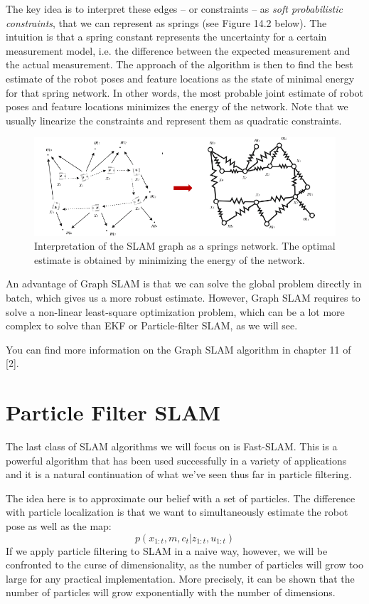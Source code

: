 \documentclass[twoside]{article}
\begin{document}
The key idea is to interpret these edges -- or constraints -- as \textit{soft probabilistic constraints}, that we can represent as springs (see Figure 14.2 below). The intuition is that a spring constant represents the uncertainty for a certain measurement model, i.e. the difference between the expected measurement and the actual measurement. The approach of the algorithm is then to find the best estimate of the robot poses and feature locations as the state of minimal energy for that spring network. In other words, the most probable joint estimate of robot poses and feature locations minimizes the energy of the network. Note that we usually linearize the constraints and represent them as quadratic constraints.

\begin{figure}[H]
\centering
\includegraphics[]{graphSLAM_fig2}
\caption{Interpretation of the SLAM graph as a springs network. The optimal estimate is obtained by minimizing the energy of the network.}
\end{figure}

An advantage of Graph SLAM is that we can solve the global problem directly in batch, which gives us a more robust estimate. However, Graph SLAM requires to solve a non-linear least-square optimization problem, which can be a lot more complex to solve than EKF or Particle-filter SLAM, as we will see.

You can find more information on the Graph SLAM algorithm in chapter 11 of [2].

\section{Particle Filter SLAM}

The last class of SLAM algorithms we will focus on is Fast-SLAM. This is a powerful algorithm that has been used successfully in a variety of applications and  it is a natural continuation of what we've seen thus far in particle filtering.

The idea here is to approximate our belief with a set of particles. The difference with particle localization is that we want to simultaneously estimate the robot pose as well as the map:
\begin{equation}
p(x_{1:t}, m, c_t | z_{1:t}, u_{1:t}) \nonumber
\end{equation}If we apply particle filtering to SLAM in a naive way, however, we will be confronted to the curse of dimensionality, as the number of particles will grow too large for any practical implementation. More precisely, it can be shown that the number of particles will grow exponentially with the number of dimensions.
\end{document}
